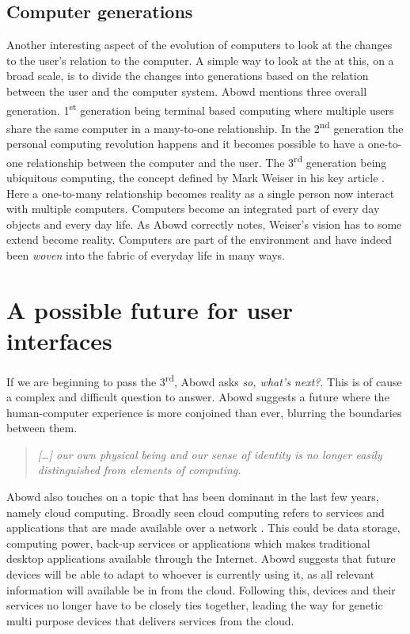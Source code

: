 \subsection{Computer generations}
Another interesting aspect of the evolution of computers to look at the changes to the user's relation to the computer.
A simple way to look at the at this, on a broad scale, is to divide the changes into generations based on the relation between the user and the computer system.
Abowd \citep{abowd2012next} mentions three overall generation.
1\textsuperscript{st} generation being terminal based computing where multiple users share the same computer in a many-to-one relationship.
In the 2\textsuperscript{nd} generation the personal computing revolution happens and it becomes possible to have a one-to-one relationship between the computer and the user.
The 3\textsuperscript{rd} generation being ubiquitous computing, the concept defined by Mark Weiser in his key article \cite{weiser1991computer}.
Here a one-to-many relationship becomes reality as a single person now interact with multiple computers. Computers become an integrated part of every day objects and every day life. 
As Abowd correctly notes, Weiser's vision has to some extend become reality. 
Computers are part of the environment and have indeed been \textit{woven} into the fabric of everyday life in many ways.   

\section{A possible future for user interfaces}
If we are beginning to pass the 3\textsuperscript{rd}, Abowd asks \textit{so, what's next?}.
This is of cause a complex and difficult question to answer.
Abowd suggests a future where the human-computer experience is more conjoined than ever, blurring the boundaries between them.
\begin{quote}
\emph{[\ldots] our own physical being and our sense of identity is no longer easily distinguished from elements of computing.}
\end{quote}
Abowd also touches on a topic that has been dominant in the last few years, namely cloud computing.
Broadly seen cloud computing refers to services and applications that are made available over a network .
This could be data storage, computing power, back-up services or applications which makes traditional desktop applications available through the Internet.
Abowd suggests that future devices will be able to adapt to whoever is currently using it, as all relevant information will available be in from the cloud.
Following this, devices and their services no longer have to be closely ties together, leading the way for genetic multi purpose devices that delivers services from the cloud.

